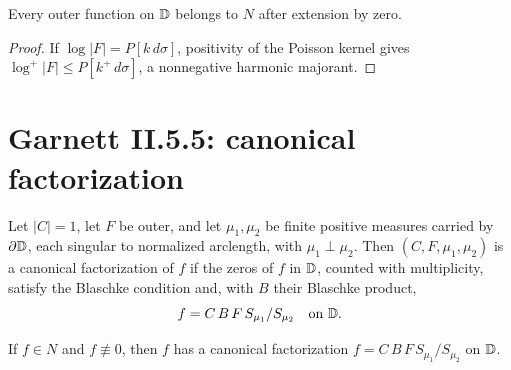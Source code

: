 \begin{theorem}
  \label{thm:outer_mem_nevanlinna}
  \leanok
  Every outer function on $\mathbb{D}$ belongs to $N$ after extension by zero.
  \begin{proof}
    \leanok
    If $\log|F|=P[k\,d\sigma]$, positivity of the Poisson kernel gives
    $\log^+|F|\le P[k^+\,d\sigma]$, a nonnegative harmonic majorant.
  \end{proof}
\end{theorem}

\section{Garnett II.5.5: canonical factorization}

\begin{definition}
  \label{def:canonical_factorization}
  \leanok
  Let $|C|=1$, let $F$ be outer, and let $\mu_1,\mu_2$ be finite positive
  measures carried by $\partial\mathbb{D}$, each singular to normalized arclength,
  with $\mu_1\perp\mu_2$. Then $(C,F,\mu_1,\mu_2)$ is a canonical
  factorization of $f$ if the zeros of $f$ in $\mathbb{D}$, counted with multiplicity,
  satisfy the Blaschke condition and, with $B$ their Blaschke product,
  \[
    f = C\,B\,F\,S_{\mu_1}/S_{\mu_2}\quad\text{on }\mathbb{D}.
  \]
\end{definition}

\begin{theorem}
  \label{thm:nevanlinna_canonical_factorization}
  \leanok
  \mainline
  If $f\in N$ and $f\not\equiv0$, then $f$ has a canonical factorization
  $f=C\,B\,F\,S_{\mu_1}/S_{\mu_2}$ on $\mathbb{D}$.
\end{theorem}

